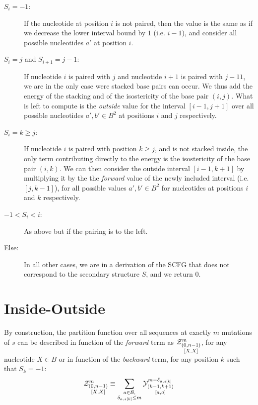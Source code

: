 \begin{description}
\item[$S_i=-1$:] If the nucleotide at position $i$ is not paired, then the value is the same
as if we decrease the lower interval bound by $1$ (i.e. $i-1$), and consider all possible
nucleotides $a'$ at position $i$.
\item[$S_{i}=j$ and $S_{i+1}=j-1$:] If nucleotide $i$ is paired with $j$ and nucleotide $i+1$ is
paired with $j-11$, we are in the only case were stacked base pairs can occur. We thus add
the energy of the stacking and of the isostericity of the base pair $(i,j)$. What is left
to compute is the \emph{outside} value for the interval $[i-1,j+1]$ over all possible nucleotides 
$a',b'\in B^2$ at positions $i$ and $j$ respectively.
\item[$S_{i}=k \geq j$:]If nucleotide $i$ is paired with position $k\geq j$, 
and is not stacked inside, the 
only term contributing directly to the energy is the isostericity of the base pair $(i,k)$. 
We can then consider the outside interval $[i-1,k+1]$ by multiplying it by the the \emph{forward}
value of the newly included interval (i.e. $[j,k-1]$), for 
all possible values $a',b'\in B^2$ for nucleotides at positions $i$ and $k$ respectively.
\item[$-1<S_{i}<i$:]As above but if the pairing is to the left.
\item[Else:] In all other cases, we are in a derivation of the SCFG that does not correspond to the 
secondary structure $S$, and we return $0$.


\end{description}

\section{Inside-Outside}
By construction, the partition function over all sequences at exactly $m$ mutations of $s$ can 
be described in function of the \emph{forward} term as $\Z{0,n-1}{m}{X,X}$,
 for any nucleotide $X\in B$ or
in function of the \emph{backward} term, for any position $k$ such that $S_k=-1$:
$$
	\Z{0,n-1}{m}{X,X}
	\equiv
	\sum_{\substack{a\in \B,\\ \Kron_{a,s[k]}\le m}}	
	\Y{k-1,k+1}{m-\Kron_{a,s[k]}}{a,a}
$$

